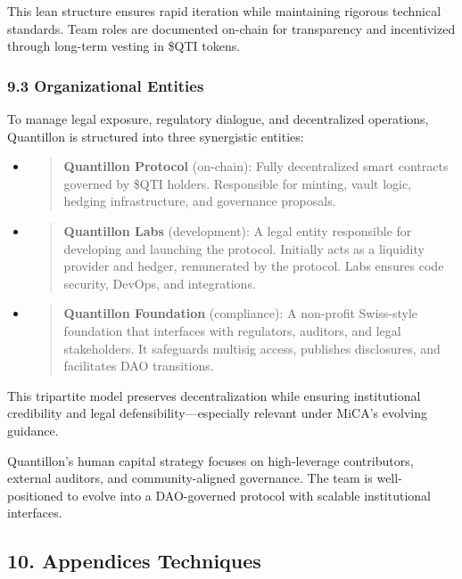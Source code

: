 This lean structure ensures rapid iteration while maintaining rigorous
technical standards. Team roles are documented on-chain for transparency
and incentivized through long-term vesting in \$QTI tokens.

\hypertarget{organizational-entities}{%
\subsubsection{9.3 Organizational
Entities}\label{organizational-entities}}

To manage legal exposure, regulatory dialogue, and decentralized
operations, Quantillon is structured into three synergistic entities:

\begin{itemize}
\item
  \begin{quote}
  \textbf{Quantillon Protocol} (on-chain): Fully decentralized smart
  contracts governed by \$QTI holders. Responsible for minting, vault
  logic, hedging infrastructure, and governance proposals.
  \end{quote}
\item
  \begin{quote}
  \textbf{Quantillon Labs} (development): A legal entity responsible for
  developing and launching the protocol. Initially acts as a liquidity
  provider and hedger, remunerated by the protocol. Labs ensures code
  security, DevOps, and integrations.
  \end{quote}
\item
  \begin{quote}
  \textbf{Quantillon Foundation} (compliance): A non-profit Swiss-style
  foundation that interfaces with regulators, auditors, and legal
  stakeholders. It safeguards multisig access, publishes disclosures,
  and facilitates DAO transitions.
  \end{quote}
\end{itemize}

This tripartite model preserves decentralization while ensuring
institutional credibility and legal defensibility---especially relevant
under MiCA's evolving guidance.

Quantillon's human capital strategy focuses on high-leverage
contributors, external auditors, and community-aligned governance. The
team is well-positioned to evolve into a DAO-governed protocol with
scalable institutional interfaces.

\hypertarget{appendices-techniques}{%
\subsection{10. Appendices Techniques}\label{appendices-techniques}}

